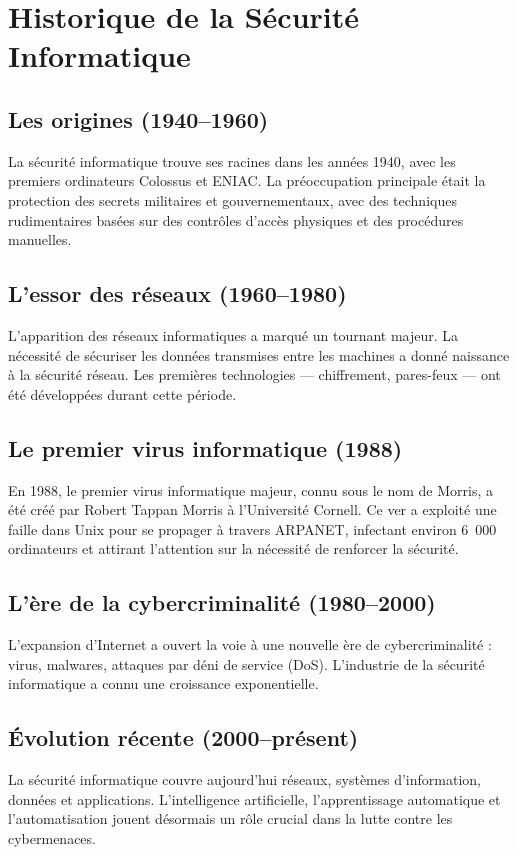 \section*{Historique de la Sécurité Informatique}

\subsection*{Les origines (1940--1960)}
La sécurité informatique trouve ses racines dans les années 1940, avec les premiers ordinateurs Colossus et ENIAC. La préoccupation principale était la protection des secrets militaires et gouvernementaux, avec des techniques rudimentaires basées sur des contrôles d'accès physiques et des procédures manuelles.

\subsection*{L'essor des réseaux (1960--1980)}
L'apparition des réseaux informatiques a marqué un tournant majeur. La nécessité de sécuriser les données transmises entre les machines a donné naissance à la sécurité réseau. Les premières technologies — chiffrement, pares-feux — ont été développées durant cette période.

\subsection*{Le premier virus informatique (1988)}
En 1988, le premier virus informatique majeur, connu sous le nom de \og{}Morris\fg{}, a été créé par Robert Tappan Morris à l'Université Cornell. Ce ver a exploité une faille dans Unix pour se propager à travers ARPANET, infectant environ 6~000 ordinateurs et attirant l'attention sur la nécessité de renforcer la sécurité.

\subsection*{L'ère de la cybercriminalité (1980--2000)}
L'expansion d'Internet a ouvert la voie à une nouvelle ère de cybercriminalité : virus, malwares, attaques par déni de service (DoS). L'industrie de la sécurité informatique a connu une croissance exponentielle.

\subsection*{Évolution récente (2000--présent)}
La sécurité informatique couvre aujourd'hui réseaux, systèmes d'information, données et applications. L'intelligence artificielle, l'apprentissage automatique et l'automatisation jouent désormais un rôle crucial dans la lutte contre les cybermenaces.

